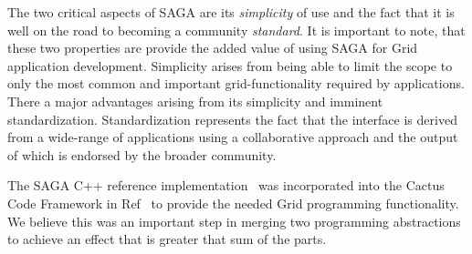 \documentclass[conference,final]{IEEEtran}
\begin{document}
The two critical aspects of SAGA are its {\it simplicity} of use and
the fact that it is well on the road to becoming a community {\it
  standard}.  It is important to note, that these two properties are
provide the added value of using SAGA for Grid application
development.  Simplicity arises from being able to limit the scope to
only the most common and important grid-functionality required by
applications.  There a major advantages arising from its simplicity
and imminent standardization.  Standardization represents the fact
that the interface is derived from a wide-range of applications using
a collaborative approach and the output of which is endorsed by the
broader community.

The SAGA C++ reference implementation~\cite{saga_web} was incorporated
into the Cactus Code Framework in Ref~\cite{escience07} to provide the
needed Grid programming functionality.  We believe this was an
important step in merging two programming abstractions to achieve an
effect that is greater that sum of the parts. 


\end{document}
